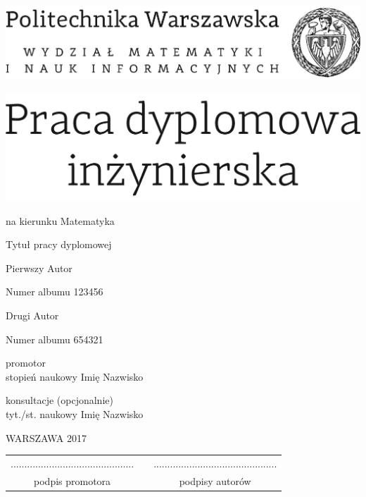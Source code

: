 \documentclass[12pt,twoside,a4paper]{article}
\newcommand{\discipline}{Matematyka}
\renewcommand{\title}{Tytuł pracy dyplomowej}
\newcommand{\supervisor}{stopień naukowy Imię Nazwisko}
\renewcommand{\year}{2017}
\newcommand{\authori}{Pierwszy Autor}
\newcommand{\albumi}{123456}
\newcommand{\authorii}{Drugi Autor}
\newcommand{\albumii}{654321}
\begin{document}
\pagestyle{empty}

\begin{center}

\includegraphics[scale=1.]{politechnika} 
\vspace{40pt}

\includegraphics[scale=1.]{praca_inz}  %

{ \arial na kierunku \discipline

\vspace{30pt}
{\arial \large \title}

\vspace{40pt}

{\arial \huge \authori }

\vspace{5pt}

Numer albumu \albumi

\vspace {20pt}
{\arial \huge \authorii}

\vspace{5pt}

Numer albumu \albumii

\vspace{40pt}

promotor \\
{\arial \supervisor}

\vspace{15pt}
 
konsultacje (opcjonalnie)  \\
{\arial tyt./st. naukowy Imię Nazwisko }

 \vfill
WARSZAWA \year \\
}
\end{center}


\newpage
\null

\vfill

\begin{center}
\begin{tabular}[t]{ccc}
............................................. & \hspace*{100pt} & .............................................\\
podpis promotora & \hspace*{100pt} & podpisy autorów
\end{tabular}
\end{center}
\end{document}
